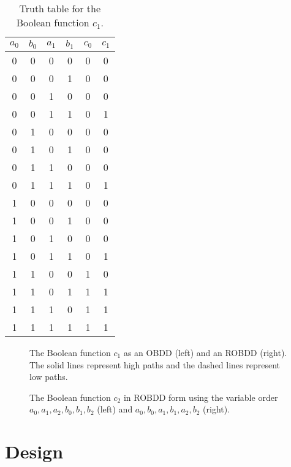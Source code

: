 \documentclass[a4paper,11pt]{kth-mag}
\begin{document}
\begin{table}
\centering
\begin{tabular}{cccc|cc}
$a_0$ & $b_0$ & $a_1$ & $b_1$ & $c_0$ & $c_1$ \\
\hline
0     & 0     & 0     & 0     & 0     & 0 \\
0     & 0     & 0     & 1     & 0     & 0 \\
0     & 0     & 1     & 0     & 0     & 0 \\
0     & 0     & 1     & 1     & 0     & 1 \\
0     & 1     & 0     & 0     & 0     & 0 \\
0     & 1     & 0     & 1     & 0     & 0 \\
0     & 1     & 1     & 0     & 0     & 0 \\
0     & 1     & 1     & 1     & 0     & 1 \\
1     & 0     & 0     & 0     & 0     & 0 \\
1     & 0     & 0     & 1     & 0     & 0 \\
1     & 0     & 1     & 0     & 0     & 0 \\
1     & 0     & 1     & 1     & 0     & 1 \\
1     & 1     & 0     & 0     & 1     & 0 \\
1     & 1     & 0     & 1     & 1     & 1 \\
1     & 1     & 1     & 0     & 1     & 1 \\
1     & 1     & 1     & 1     & 1     & 1 \\
\end{tabular}
\caption{Truth table for the Boolean function $c_1$.}
\label{tab:tt_c1}
\end{table}

\begin{figure}[p]
\centering

\caption{The Boolean function $c_1$ as an OBDD (left) and an ROBDD (right). The solid lines represent high paths and the dashed lines represent low paths.}
\label{fig:bdd_c1}
\end{figure}

\begin{figure}[p]
\centering

\caption{The Boolean function $c_2$ in ROBDD form using the variable order $a_0,a_1,a_2,b_0,b_1,b_2$ (left) and $a_0,b_0,a_1,b_1,a_2,b_2$ (right).}
\label{fig:bdd_c2_bad}
\end{figure}

\chapter{Design}
\label{ch:design}
\end{document}
